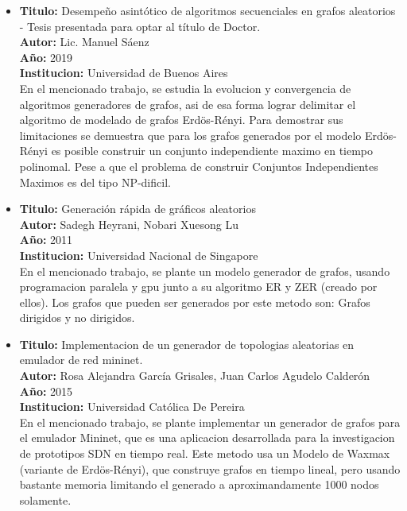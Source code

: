 \documentclass[11pt]{extarticle}
\begin{document}
\begin{itemize}
  \item \textbf{Titulo:} Desempeño asintótico de algoritmos secuenciales
  en grafos aleatorios - Tesis presentada para optar al título de Doctor.\\
  \textbf{Autor:} Lic. Manuel Sáenz \\
  \textbf{A\~no:} 2019\\
  \textbf{Institucion:} Universidad de Buenos Aires\\
  En el mencionado trabajo, se estudia la evolucion y convergencia de algoritmos
  generadores de grafos, asi de esa forma lograr delimitar el algoritmo de modelado 
  de grafos Erdös-Rényi. Para demostrar sus limitaciones se demuestra que para los grafos
  generados por el modelo Erdös-Rényi es posible construir un conjunto independiente  maximo
  en tiempo polinomal. Pese a que el problema de construir Conjuntos Independientes Maximos es
  del tipo NP-dificil.

\end{itemize}

\begin{itemize}
  \item \textbf{Titulo:} Generación rápida de gráficos aleatorios\\
  \textbf{Autor:} Sadegh Heyrani, Nobari Xuesong Lu \\
  \textbf{A\~no:} 2011\\
  \textbf{Institucion:} Universidad Nacional de Singapore\\
  En el mencionado trabajo, se plante un modelo generador de grafos, usando programacion
  paralela y gpu junto a su algoritmo ER y ZER (creado por ellos). Los grafos que pueden ser
  generados por este metodo son: Grafos dirigidos y no dirigidos.
\end{itemize}

\begin{itemize}
  \item \textbf{Titulo:} Implementacion de un generador de topologias aleatorias en emulador de red mininet.\\
  \textbf{Autor:} Rosa Alejandra García Grisales, Juan Carlos Agudelo Calderón\\
  \textbf{A\~no:} 2015\\
  \textbf{Institucion:} Universidad Católica De Pereira\\
  En el mencionado trabajo, se plante implementar un generador de grafos para el emulador Mininet, que es 
  una aplicacion desarrollada para la investigacion de prototipos SDN en tiempo real.
  Este metodo usa un Modelo de Waxmax (variante de Erdös-Rényi), que construye grafos en tiempo lineal, 
  pero usando bastante memoria limitando el generado a aproximandamente 1000 nodos solamente.
\end{itemize}
\end{document}
